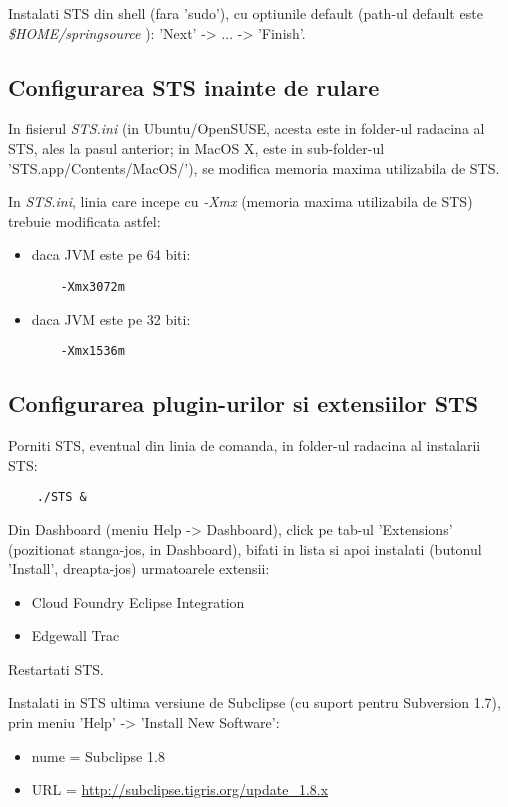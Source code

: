 Instalati STS din shell (fara 'sudo'), cu optiunile default (path-ul default este \emph{\$HOME/springsource} ):
'Next' -> ... -> 'Finish'.

\subsection{Configurarea STS inainte de rulare}
In fisierul \emph{STS.ini} (in Ubuntu/OpenSUSE, acesta este in folder-ul
radacina al STS, ales la pasul anterior; in MacOS X, este in sub-folder-ul
'STS.app/Contents/MacOS/'), se modifica memoria maxima utilizabila de STS.

In \emph{STS.ini}, linia care incepe cu \emph{-Xmx} 
(memoria maxima utilizabila de STS) 
trebuie modificata astfel:
\begin{itemize} 
\item daca JVM este pe 64 biti:
\begin{lstlisting}
	-Xmx3072m
\end{lstlisting}
\item daca JVM este pe 32 biti:
\begin{lstlisting}
	-Xmx1536m
\end{lstlisting}
\end{itemize}

\subsection{Configurarea plugin-urilor si extensiilor STS}

Porniti STS, eventual din linia de comanda, in folder-ul radacina al instalarii STS:
\begin{lstlisting}	
	./STS &
\end{lstlisting}

Din Dashboard (meniu Help -> Dashboard), click pe tab-ul 'Extensions'
(pozitionat stanga-jos, in Dashboard), bifati in lista si apoi instalati
(butonul 'Install', dreapta-jos) urmatoarele extensii:
\begin{itemize}
\item
Cloud Foundry Eclipse Integration
\item
Edgewall Trac
\end{itemize} 

Restartati STS.

Instalati in STS ultima versiune de Subclipse (cu suport pentru Subversion 1.7),
prin meniu 'Help' -> 'Install New Software':
\begin{itemize}
\item 
nume = Subclipse 1.8
\item
URL = \url{http://subclipse.tigris.org/update_1.8.x}
\end{itemize}

